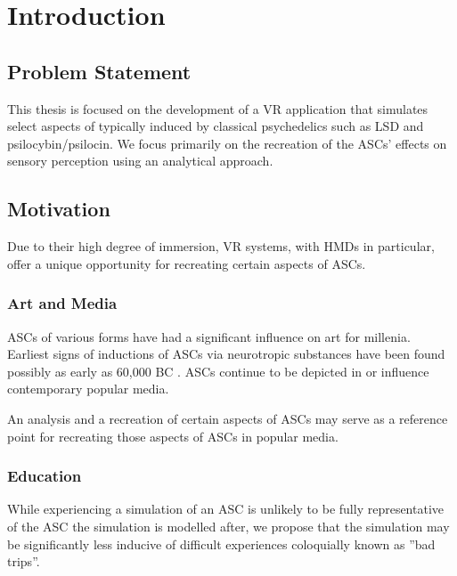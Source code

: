\chapter{Introduction}\label{sec:introduction}
\vspace{-1.6em}
%

\minitoc
\thispagestyle{empty}
\newpage

\section{Problem Statement}
This thesis is focused on the development of a \ac{VR} application that simulates select aspects of  typically induced by classical psychedelics such as LSD and psilocybin/psilocin.
We focus primarily on the recreation of the \acp{ASC}' effects on sensory perception using an analytical approach.

\section{Motivation}
Due to their high degree of immersion, \ac{VR} systems, with \acp{HMD} in particular, offer a unique opportunity for recreating certain aspects of \acp{ASC}.

\subsection{Art and Media}
\Acp{ASC} of various forms have had a significant influence on art for millenia. Earliest signs of inductions of \acp{ASC} via neurotropic substances have been found possibly as early as 60,000 BC \autocite{guerra2015psychoactive}. \Acp{ASC} continue to be depicted in or influence contemporary popular media.

An analysis and a recreation of certain aspects of \acp{ASC} may serve as a reference point for recreating those aspects of \acp{ASC} in popular media.

\subsection{Education}
While experiencing a simulation of an \ac{ASC} is unlikely to be fully representative of the \ac{ASC} the simulation is modelled after, we propose that the simulation may be significantly less inducive of difficult experiences coloquially known as ''bad trips''.

